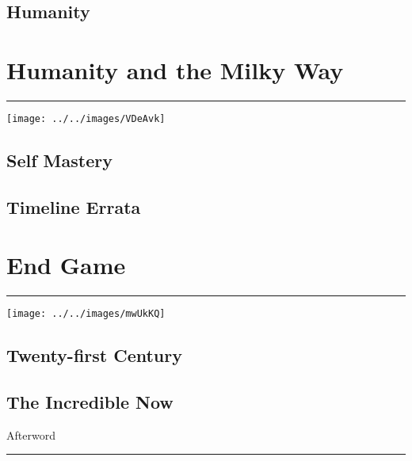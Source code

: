 \documentclass[letterpaper,10.5pt,twoside,onecolumn,openany]{book}
\begin{document}
\chapter{Humanity}




\part{Humanity and the Milky Way}

\thispagestyle{empty}

	\hrule

\vspace{30mm}

\begin{center}
	\texttt{[image: ../../images/VDeAvk]}
\end{center}


\chapter{Self Mastery}

\chapter{Timeline Errata}



\part{End Game}

\thispagestyle{empty}
	\hrule

\vspace{30mm}
\begin{center}
	\texttt{[image: ../../images/mwUkKQ]}
\end{center}

\chapter{Twenty-first Century}

\chapter{The Incredible Now}


\newpage

\begin{center}
	\huge{Afterword}
\end{center}
\hrule
\end{document}
